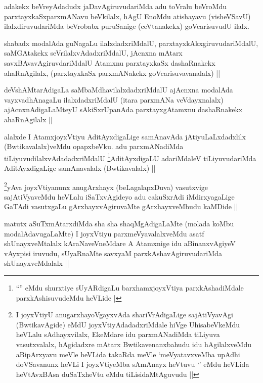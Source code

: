 \begin{artha}
adakekx beVreyAdadudx jaDavAgiruvudariMda adu toVralu beVroMdu parxtayxkaSxparxmANavu beVkilalx, hAgU EnoMdu atishayavu (visheVSavU) ilalxdiruvudariMda beVrobabx puruSanige (ceVtanakekx) goVcarisuvudU ilalx.
\end{artha}

\begin{artha}
shabadx modalAda guNagaLu ilalxdadxriMdalU, parxtayxkAkxgiruvudariMdalU, saMGAtakekx seVrilalxvAdadxriMdalU, jAcnxna mAtarx savxBAvavAgiruvdariMdalU Atamxnu parxtayxkaSx dashaRnakekx ahaRnAgilalx, (parxtayxkaSx parxmANakekx goVcarisuvavanalalx) ||
\end{artha}

\begin{artha}
deVshAMtarAdigaLa saMbaMdhavilalxdadxriMdalU ajAcnxna modalAda vayxvadhAnagaLu ilalxdadxriMdalU (itara parxmANa veVdayxnalalx) ajAcnxnAdigaLaMteyU sAkiSxrUpanAda parxtayxgAtamxnu dashaRnakekx ahaRnAgilalx ||
\end{artha}

\begin{artha}
alalxde I AtamxjoyxVtiyu AditAyxdigaLige samAnavAda jAtiyuLaLxdadxlilx (Bwtikavalalx)veMdu opapxbeVku. adu parxmANadiMda tiLiyuvudilalxvAdadadxriMdalU \footnote{``\stext'' eMdu shurxtiye sUyARdigaLu barxhamxjoyxVtiya parxkAshadiMdale parxkAshisuvudeMdu heVLide |}AditAyxdigaLU adariMdaleV tiLiyuvudariMda AditAyxdigaLige samAnavalalx (Bwtikavalalx) ||
\end{artha}

\begin{artha}
\footnote{I joyxVtiyU anugarxhayoVgayxvAda shariVrAdigaLige sajAtiVyavAgi (BwtikavAgide) eMdU joyxVtiyAdadadxriMdale hiVge UhisabeVkeMdu heVLalu sAdhayxvilalx, EkeMdare idu parxmANadiMda tiLiyuva vasutxvalalx, hAgidadxre mAtarx Bwtikavenanxbahudu idu hAgilalxveMdu aBipArxyavu meVle heVLida takaRda meVle `meVyatavxveMba upAdhi doVSavanunx heVLi I joyxVtiyeMba sAmAnayx heVtuvu `\stext' eMdu heVLida heVtAvxBAsa duSaTxheVtu eMdu tiLisidaMtAguvudu ||}yAva joyxVtiyanunx anugArxhayx (beLagalapxDuva) vasutxvige sajAtiVyaveMdu heVLalu iSaTxvAgideyo adu cakuSxrAdi iMdirxyagaLige GaTAdi vasutxgaLu gArxhayxvAgiruvaMte gArxhayxveMbudu kaMDide ||
\end{artha}

\begin{artha}
matutx aSuTxmAtarxdiMda sha sha shaqMgAdigaLaMte (molada koMbu modalAdavugaLaMte) I joyxVtiyu parxmeVyavalalxveMdu asatf shUnayxveMtalalx kAraNaveVneMdare A Atamxnige idu aBinanxvAgiyeV vAyxpisi iruvudu, sUyaRnaMte savxyaM parxkAshavAgiruvudariMda shUnayxveMdalalx ||
\end{artha}

